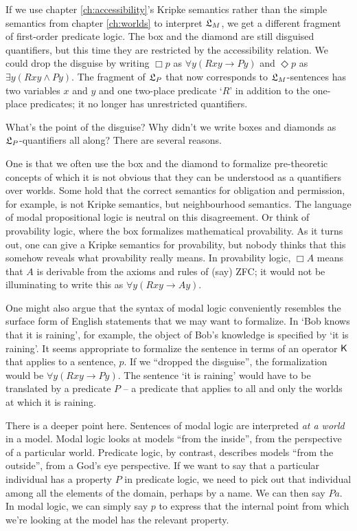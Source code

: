 If we use chapter \ref{ch:accessibility}'s Kripke semantics rather than the
simple semantics from chapter \ref{ch:worlds} to interpret $\mathfrak{L}_{M}$, we get a
different fragment of first-order predicate logic. The box and the diamond are
still disguised quantifiers, but this time they are restricted by the
accessibility relation. We could drop the disguise by writing $\Box p$ as
$\forall y(Rxy \to Py)$ and $\Diamond p$ as $\exists y(Rxy \land Py)$. The
fragment of $\mathfrak{L}_P$ that now corresponds to $\mathfrak{L}_M$-sentences has two variables
$x$ and $y$ and one two-place predicate `$R$' in addition to the one-place
predicates; it no longer has unrestricted quantifiers.

What's the point of the disguise? Why didn't we write boxes and diamonds as
$\mathfrak{L}_P$-quantifiers all along? There are several reasons.

One is that we often use the box and the diamond to formalize pre-theoretic
concepts of which it is not obvious that they can be understood as a quantifiers
over worlds. Some hold that the correct semantics for obligation and permission,
for example, is not Kripke semantics, but neighbourhood semantics. The language
of modal propositional logic is neutral on this disagreement. Or think of
provability logic, where the box formalizes mathematical provability. As it
turns out, one can give a Kripke semantics for provability, but nobody thinks
that this somehow reveals what provability really means. In provability logic,
$\Box A$ means that $A$ is derivable from the axioms and rules of (say) ZFC; it
would not be illuminating to write this as $\forall y(Rxy \to Ay)$.

One might also argue that the syntax of modal logic conveniently resembles the
surface form of English statements that we may want to formalize. In `Bob knows
that it is raining', for example, the object of Bob's knowledge is specified by
`it is raining'. It seems appropriate to formalize the sentence in terms of an
operator $\operatorname{\mathsf{K}{}}$ that applies to a sentence, $p$. If we ``dropped the disguise'',
the formalization would be $\forall y(Rxy \to Py)$. The sentence `it is raining'
would have to be translated by a predicate $P$ -- a predicate that applies to
all and only the worlds at which it is raining.

There is a deeper point here. Sentences of modal logic are interpreted \emph{at
  a world} in a model. Modal logic looks at models ``from the inside'', from the
perspective of a particular world. Predicate logic, by contrast, describes
models ``from the outside'', from a God's eye perspective. If we want to say
that a particular individual has a property $P$ in predicate logic, we need to
pick out that individual among all the elements of the domain, perhaps by a
name. We can then say $Pa$. In modal logic, we can simply say $p$ to express
that the internal point from which we're looking at the model has the relevant
property.

